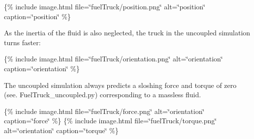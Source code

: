 \{\% include image.\+html file=\char`\"{}fuel\+Truck/position.\+png\char`\"{} alt=\char`\"{}position\char`\"{} caption=\char`\"{}position\char`\"{} \%\}

As the inertia of the fluid is also neglected, the truck in the uncoupled simulation turns faster\+:

\{\% include image.\+html file=\char`\"{}fuel\+Truck/orientation.\+png\char`\"{} alt=\char`\"{}orientation\char`\"{} caption=\char`\"{}orientation\char`\"{} \%\}

The uncoupled simulation always predicts a sloshing force and torque of zero (see. Fuel\+Truck\+\_\+uncoupled.\+py) corresponding to a massless fluid.

\{\% include image.\+html file=\char`\"{}fuel\+Truck/force.\+png\char`\"{} alt=\char`\"{}orientation\char`\"{} caption=\char`\"{}force\char`\"{} \%\} \{\% include image.\+html file=\char`\"{}fuel\+Truck/torque.\+png\char`\"{} alt=\char`\"{}orientation\char`\"{} caption=\char`\"{}torque\char`\"{} \%\} 